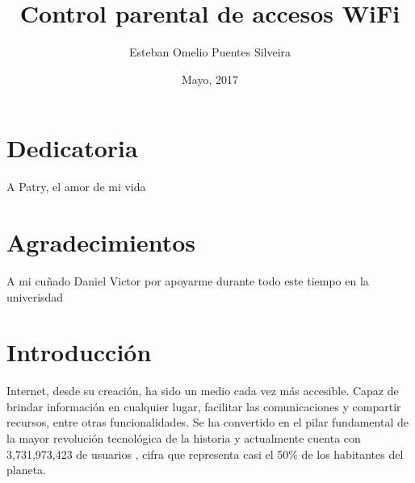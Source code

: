 \documentclass[12pt]{article}
\title{Control parental de accesos WiFi}
\author{Esteban Omelio Puentes Silveira}
\date{Mayo, 2017}
\begin{document}
\maketitle


\clearpage


\section{Dedicatoria}
A Patry, el amor de mi vida

\section{Agradecimientos}
A mi cuñado Daniel Victor por apoyarme durante todo este tiempo en la univerisdad



\renewcommand\contentsname{Índice}
\tableofcontents
\printindex


\section{Introducción}

Internet, desde su creación, ha sido un medio cada vez más accesible. Capaz de brindar información en cualquier lugar, facilitar las comunicaciones y compartir recursos, entre otras funcionalidades. Se ha convertido en el pilar fundamental de la mayor revolución tecnológica de la historia y actualmente cuenta con 3,731,973,423 de usuarios , cifra que representa casi el 50\% de los habitantes del planeta. 
\end{document}
